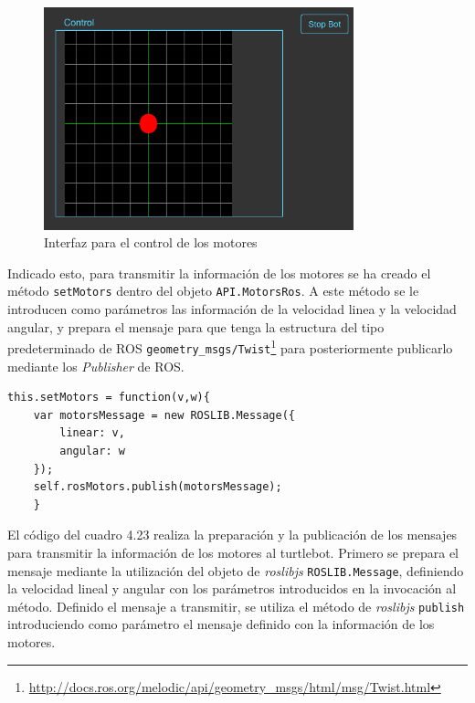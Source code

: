 \begin{figure}[H]
  \begin{center}
    \includegraphics[width=0.8\textwidth]{figures/controlturtle.png}
		\caption{Interfaz para el control de los motores}
		\label{fig.controlturtle}
		\end{center}
\end{figure}

Indicado esto, para transmitir la información de los motores se ha creado el método \texttt{setMotors} dentro del objeto \texttt{API.MotorsRos}. A este método se le introducen como parámetros las información de la velocidad linea y la velocidad angular, y prepara el mensaje para que tenga la estructura del tipo predeterminado de ROS \texttt{geometry\_msgs/Twist}\footnote{\url{http://docs.ros.org/melodic/api/geometry_msgs/html/msg/Twist.html}} para posteriormente publicarlo mediante los \textit{Publisher} de ROS.

\begin{lstlisting}[caption= Preparación y publicación del mensaje con el control de los motores, label=cod.motores]
this.setMotors = function(v,w){
	var motorsMessage = new ROSLIB.Message({
		linear: v,
		angular: w
	});
	self.rosMotors.publish(motorsMessage);
	}
\end{lstlisting}

El código del cuadro 4.23 realiza la preparación y la publicación de los mensajes para transmitir la información de los motores al turtlebot. Primero se prepara el mensaje mediante la utilización del objeto de \textit{roslibjs} \texttt{ROSLIB.Message}, definiendo la velocidad lineal y angular con los parámetros introducidos en la invocación al método. Definido el mensaje a transmitir, se utiliza el método de \textit{roslibjs} \texttt{publish} introduciendo como parámetro el mensaje definido con la información de los motores.

